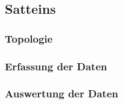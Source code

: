\subsection{Satteins}
\subsubsection{Topologie}
\subsubsection{Erfassung der Daten}
\subsubsection{Auswertung der Daten}